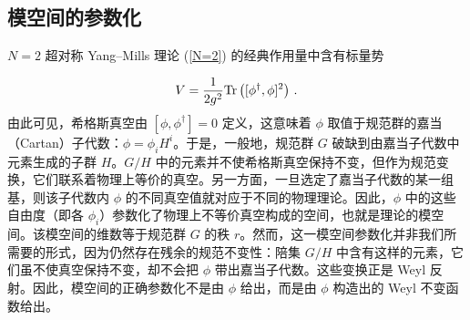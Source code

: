 

\subsection{模空间的参数化}

$N=2$ 超对称 Yang--Mills 理论 (\ref{N=2}) 的经典作用量中含有标量势

$$
V={1\over 2g^2}{\rm Tr}\left([\phi^\dagger,\phi]^2\right)\,.
$$
由此可见，希格斯真空由 $[\phi,\phi^\dagger]=0$ 定义，这意味着 $\phi$ 取值于规范群的嘉当（Cartan）子代数：$\phi= \phi_i H^i$。于是，一般地，规范群 $G$ 破缺到由嘉当子代数中元素生成的子群 $H$。$G/H$ 中的元素并不使希格斯真空保持不变，但作为规范变换，它们联系着物理上等价的真空。另一方面，一旦选定了嘉当子代数的某一组基，则该子代数内 $\phi$ 的不同真空值就对应于不同的物理理论。因此，$\phi$ 中的这些自由度（即各 $\phi_i$）参数化了物理上不等价真空构成的空间，也就是理论的模空间。该模空间的维数等于规范群 $G$ 的秩 $r$。然而，这一模空间参数化并非我们所需要的形式，因为仍然存在残余的规范不变性：陪集 $G/H$ 中含有这样的元素，它们虽不使真空保持不变，却不会把 $\phi$ 带出嘉当子代数。这些变换正是 Weyl 反射。因此，模空间的正确参数化不是由 $\phi$ 给出，而是由 $\phi$ 构造出的 Weyl 不变函数给出。


